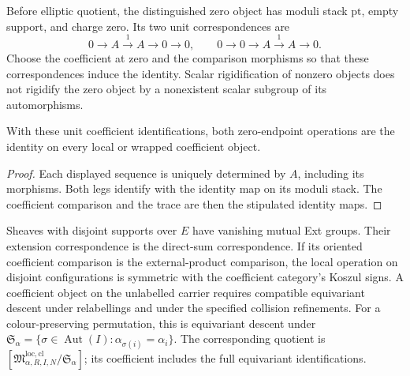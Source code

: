 \begin{definition}
\label{def:hybrid-unit-object-vacuum-correspondences}
Before elliptic quotient, the distinguished zero object has
moduli stack $\mathrm{pt}$, empty support, and charge zero.
Its two unit correspondences are
\[
 0\longrightarrow A\xrightarrow{1}A\longrightarrow0\longrightarrow0,
 \qquad
 0\longrightarrow0\longrightarrow A\xrightarrow{1}A\longrightarrow0.
\]
Choose the coefficient at zero and the comparison morphisms so
that these correspondences induce the identity. Scalar
rigidification of nonzero objects does not rigidify the zero
object by a nonexistent scalar subgroup of its automorphisms.
\end{definition}

\begin{proposition}
\label{prop:local-unit-compatibility}
\label{prop:wrapped-unit-compatibility}
With these unit coefficient identifications, both zero-endpoint
operations are the identity on every local or wrapped coefficient
object.
\end{proposition}

\begin{proof}
Each displayed sequence is uniquely determined by $A$, including
its morphisms. Both legs identify with the identity map on its
moduli stack. The coefficient comparison and the trace are then
the stipulated identity maps.
\end{proof}

\begin{proposition}
\label{prop:local-configuration-symmetric-descent}
Sheaves with disjoint supports over $E$ have vanishing mutual Ext
groups. Their extension correspondence is the direct-sum
correspondence. If its oriented coefficient comparison is the
external-product comparison, the local operation on disjoint
configurations is symmetric with the coefficient category's
Koszul signs. A coefficient object on the unlabelled carrier
requires compatible equivariant descent under relabellings and
under the specified collision refinements.
For a colour-preserving permutation, this is equivariant descent
under
$\mathfrak S_\alpha=\{\sigma\in\operatorname{Aut}(I):
\alpha_{\sigma(i)}=\alpha_i\}$.
The corresponding quotient is
$[\mathfrak M^{\mathrm{loc,cl}}_{\alpha,R,I,N}/\mathfrak S_\alpha]$;
its coefficient includes the full equivariant identifications.
\end{proposition}

